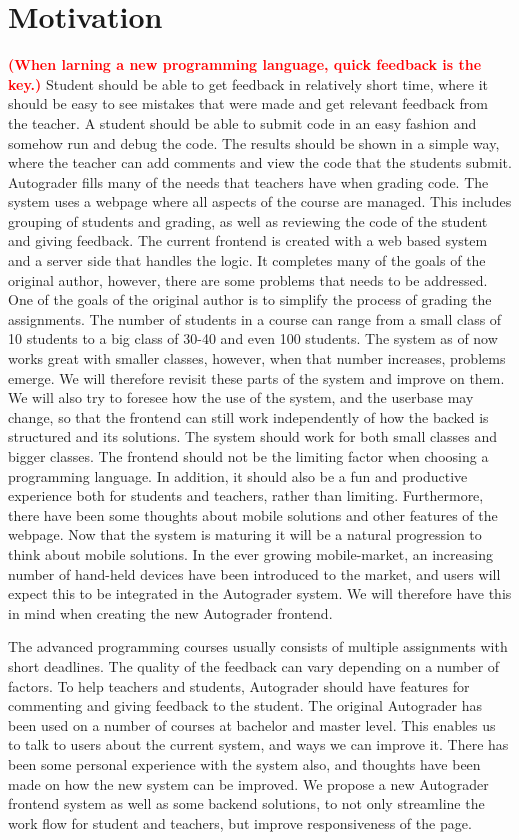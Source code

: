 \documentclass[12pt,a4paper]{report}
\newcommand\worry[1]{\textcolor{red}{\textbf{\small{(#1)}}}}
\begin{document}
\chapter*{Motivation}

\worry{When larning a new programming language, quick feedback is the key.} Student should be able to get feedback in relatively short time, where it should be easy to see mistakes that were made and get relevant feedback from the teacher. A student should be able to submit code in an easy fashion and somehow run and debug the code. The results should be shown in a simple way, where the teacher can add comments and view the code that the students submit. Autograder fills many of the needs that teachers have when grading code. The system uses a webpage where all aspects of the course are managed. This includes grouping of students and grading, as well as reviewing the code of the student and giving feedback. The current frontend is created with a web based system and a server side that handles the logic. It completes many of the goals of the original author, however, there are some problems that needs to be addressed. One of the goals of the original author is to simplify the process of grading the assignments. The number of students in a course can range from a small class of 10 students to a big class of 30-40 and even 100 students. The system as of now works great with smaller classes, however, when that number increases, problems emerge. We will therefore revisit these parts of the system and improve on them. We will also try to foresee how the use of the system, and the userbase may change, so that the frontend can still work independently of how the backed is structured and its solutions. The system should work for both small classes and bigger classes. The frontend should not be the limiting factor when choosing a programming language. In addition, it should also be a fun and productive experience both for students and teachers, rather than limiting. Furthermore, there have been some thoughts about mobile solutions and other features of the webpage. Now that the system is maturing it will be a natural progression to think about mobile solutions. In the ever growing mobile-market, an increasing number of hand-held devices have been introduced to the market, and users will expect this to be integrated in the Autograder system. We will therefore have this in mind when creating the new Autograder frontend.

The advanced programming courses usually consists of multiple assignments with short deadlines. The quality of the feedback can vary depending on a number of factors. To help teachers and students, Autograder should have features for commenting and giving feedback to the student. The original Autograder has been used on a number of courses at bachelor and master level. This enables us to talk to users about the current system, and ways we can improve it. There has been some personal experience with the system also, and thoughts have been made on how the new system can be improved. We propose a new Autograder frontend system as well as some backend solutions, to not only streamline the work flow for student and teachers, but improve responsiveness of the page.
\end{document}
